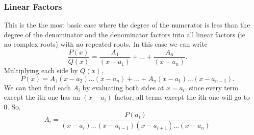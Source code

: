 \subsubsection{Linear Factors}

This is the the most basic case where the degree of the numerator is less than the degree of the denominator and the denominator factors into all linear factors (ie no complex roots) with no repeated roots.
In this case we can write
\begin{equation*}
	\frac{P(x)}{Q(x)} = \frac{A_1}{(x-a_1)} + \ldots + \frac{A_n}{(x-a_n)}.
\end{equation*}
Multiplying each side by $Q(x)$,
\begin{equation*}
	P(x) = A_1(x-a_2) \ldots (x-a_n) + \ldots + A_n(x-a_1) \ldots (x-a_{n-1}).
\end{equation*}
We can then find each $A_i$ by evaluating both sides at $x=a_i$, since every term except the ith one has an $(x-a_i)$ factor, all terms except the ith one will go to 0.
So,
\begin{equation*}
	A_i = \frac{P(a_i)}{(x-a_i) \ldots (x-a_{i-1})(x-a_{i+1}) \ldots (x-a_n)}
\end{equation*}

